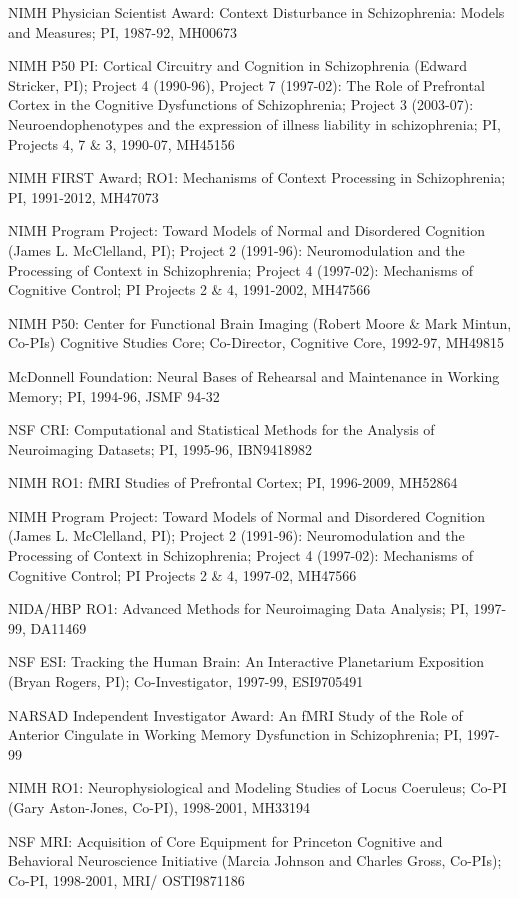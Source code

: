\documentclass[10 pt]{article}
\begin{document}
NIMH Physician Scientist Award:
Context Disturbance in Schizophrenia: Models and Measures;
PI,
1987-92,
MH00673

NIMH P50 PI:
Cortical Circuitry and Cognition in Schizophrenia (Edward Stricker, PI);
Project 4 (1990-96),
Project 7 (1997-02): The Role of Prefrontal Cortex in the Cognitive Dysfunctions of Schizophrenia;
Project 3 (2003-07): Neuroendophenotypes and the expression of illness liability in schizophrenia;
PI, Projects 4, 7 \& 3,
1990-07,
MH45156

NIMH FIRST Award; RO1:
Mechanisms of Context Processing in Schizophrenia;
PI,
1991-2012,
MH47073

NIMH Program Project:
Toward Models of Normal and Disordered Cognition (James L. McClelland, PI);
Project 2 (1991-96): Neuromodulation and the Processing of Context in Schizophrenia;
Project 4 (1997-02): Mechanisms of Cognitive Control;
PI Projects 2 \& 4,
1991-2002,
MH47566

NIMH P50:
Center for Functional Brain Imaging (Robert Moore \& Mark Mintun, Co-PIs) Cognitive Studies Core;
Co-Director, Cognitive Core,
1992-97,
MH49815

McDonnell Foundation:
Neural Bases of Rehearsal and Maintenance in Working Memory;
PI,
1994-96,
JSMF 94-32

NSF CRI:
Computational and Statistical Methods for the Analysis of Neuroimaging Datasets;
PI,
1995-96,
IBN9418982

NIMH RO1:
fMRI Studies of Prefrontal Cortex;
PI,
1996-2009,
MH52864

NIMH Program Project:
Toward Models of Normal and Disordered Cognition (James L. McClelland, PI);
Project 2 (1991-96): Neuromodulation and the Processing of Context in Schizophrenia;
Project 4 (1997-02): Mechanisms of Cognitive Control;
PI Projects 2 \& 4,
1997-02,
MH47566

NIDA/HBP RO1:
Advanced Methods for Neuroimaging Data Analysis;
PI,
1997-99,
DA11469

NSF ESI:
Tracking the Human Brain: An Interactive Planetarium Exposition (Bryan Rogers, PI);
Co-Investigator,
1997-99,
ESI9705491

NARSAD Independent Investigator Award:
An fMRI Study of the Role of Anterior Cingulate in Working Memory Dysfunction in Schizophrenia;
PI,
1997-99

NIMH RO1:
Neurophysiological and Modeling Studies of Locus Coeruleus;
Co-PI (Gary Aston-Jones, Co-PI),
1998-2001,
MH33194

NSF MRI:
Acquisition of Core Equipment for Princeton Cognitive and Behavioral Neuroscience Initiative (Marcia Johnson and
Charles Gross, Co-PIs);
Co-PI,
1998-2001,
MRI/ OSTI9871186
\end{document}
